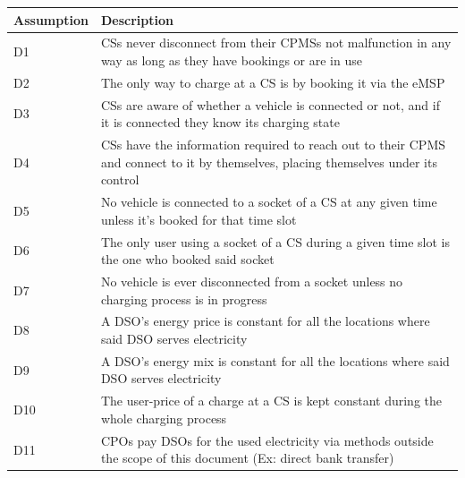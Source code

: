 \documentclass[11pt]{article}
\begin{document}
\begin{table}[H]
    \centering
    \setlength{\tabcolsep}{18pt}
    \renewcommand{\arraystretch}{1.2}
    \begin{tabularx}{\textwidth}{|>{\centering\hsize=0.3\hsize}X|>{\hsize=1.7\hsize}X|}
        \hline
        \textbf{Assumption} & \textbf{Description} \\
        \hline
        D1 & CSs never disconnect from their CPMSs not malfunction in any way as long as they have bookings or are in use \\
        \hline
        D2 & The only way to charge at a CS is by booking it via the eMSP \\
        \hline
        D3 & CSs are aware of whether a vehicle is connected or not, and if it is connected they know its charging state \\
        \hline
        D4 & CSs have the information required to reach out to their CPMS and connect to it by themselves, placing themselves under its control \\
        \hline
        D5 & No vehicle is connected to a socket of a CS at any given time unless it's booked for that time slot \\
        \hline
        D6 & The only user using a socket of a CS during a given time slot is the one who booked said socket \\
        \hline
        D7 & No vehicle is ever disconnected from a socket unless no charging process is in progress \\
        \hline
        D8 & A DSO's energy price is constant for all the locations where said DSO serves electricity \\
        \hline
        D9 & A DSO's energy mix is constant for all the locations where said DSO serves electricity \\
        \hline
        D10 & The user-price of a charge at a CS is kept constant during the whole charging process \\
        \hline
        D11 & CPOs pay DSOs for the used electricity via methods outside the scope of this document (Ex: direct bank transfer) \\
        \hline
    \end{tabularx}
    \label{tab:domain_assumptions}
\end{table}
\end{document}
